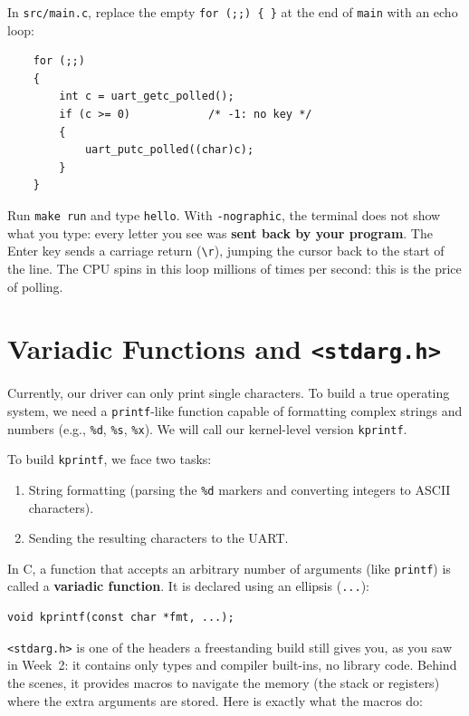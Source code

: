In \texttt{src/main.c}, replace the empty \texttt{for (;;) \{ \}} at the end of \texttt{main} with an echo loop:

\begin{lstlisting}
    for (;;)
    {
        int c = uart_getc_polled();
        if (c >= 0)            /* -1: no key */
        {
            uart_putc_polled((char)c);
        }
    }
\end{lstlisting}

Run \texttt{make run} and type \texttt{hello}. With \texttt{-nographic}, the terminal does not show what you type: every letter you see was \textbf{sent back by your program}. The Enter key sends a carriage return (\texttt{\textbackslash r}), jumping the cursor back to the start of the line. The CPU spins in this loop millions of times per second: this is the price of polling.

\section{Variadic Functions and \texttt{<stdarg.h>}}
Currently, our driver can only print single characters. To build a true operating system, we need a \texttt{printf}-like function capable of formatting complex strings and numbers (e.g., \texttt{\%d}, \texttt{\%s}, \texttt{\%x}). We will call our kernel-level version \texttt{kprintf}.

To build \texttt{kprintf}, we face two tasks:
\begin{enumerate}
    \item String formatting (parsing the \texttt{\%d} markers and converting integers to ASCII characters).
    \item Sending the resulting characters to the UART.
\end{enumerate}

In C, a function that accepts an arbitrary number of arguments (like \texttt{printf}) is called a \textbf{variadic function}. It is declared using an ellipsis (\texttt{...}):

\begin{lstlisting}
void kprintf(const char *fmt, ...);
\end{lstlisting}

\texttt{<stdarg.h>} is one of the headers a freestanding build still gives you, as you saw in Week~2: it contains only types and compiler built-ins, no library code. Behind the scenes, it provides macros to navigate the memory (the stack or registers) where the extra arguments are stored. Here is exactly what the macros do:

